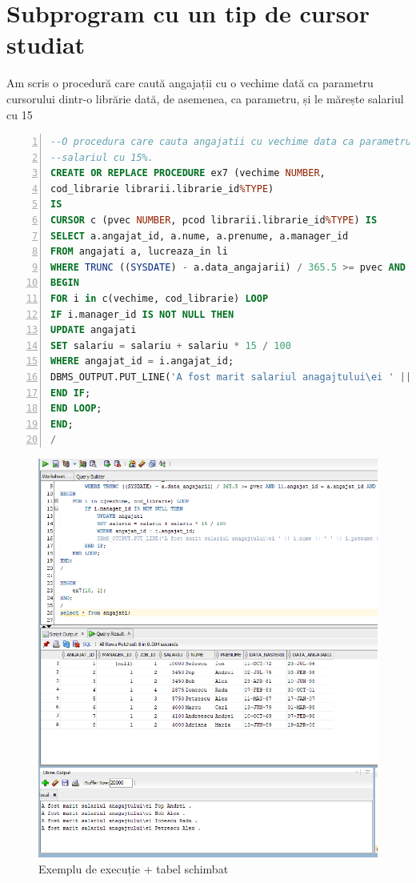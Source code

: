 \documentclass[12pt]{article}
\begin{document}
\section{Subprogram cu un tip de cursor studiat}
Am scris o procedură care caută angajații cu o vechime dată ca parametru cursorului dintr-o librărie dată, de asemenea, ca parametru, și le mărește salariul cu 15%
\begin{lstlisting}[language=SQL,
	showspaces=false,
	basicstyle=\ttfamily,
	numbers=left,
	numberstyle=\tiny,
	breaklines=true,
	commentstyle=\color{gray}]
--O procedura care cauta angajatii cu vechime data ca parametru dintr-o librarie data de asemenea ca parametru si le mareste 
--salariul cu 15%.
CREATE OR REPLACE PROCEDURE ex7 (vechime NUMBER,
cod_librarie librarii.librarie_id%TYPE)
IS
CURSOR c (pvec NUMBER, pcod librarii.librarie_id%TYPE) IS
SELECT a.angajat_id, a.nume, a.prenume, a.manager_id
FROM angajati a, lucreaza_in li
WHERE TRUNC ((SYSDATE) - a.data_angajarii) / 365.5 >= pvec AND li.angajat_id = a.angajat_id AND li.librarie_id = pcod;
BEGIN
FOR i in c(vechime, cod_librarie) LOOP
IF i.manager_id IS NOT NULL THEN
UPDATE angajati
SET salariu = salariu + salariu * 15 / 100
WHERE angajat_id = i.angajat_id;
DBMS_OUTPUT.PUT_LINE('A fost marit salariul anagajtului\ei ' || i.nume || ' ' || i.prenume || ' .');
END IF;
END LOOP;
END;
/
\end{lstlisting}
\begin{figure}[!htb]
	\includegraphics[max width=\linewidth]{imgs/ex7.png}
	\caption{Exemplu de execuție + tabel schimbat}
	\label{fig:ex7}
\end{figure}
\end{document}
